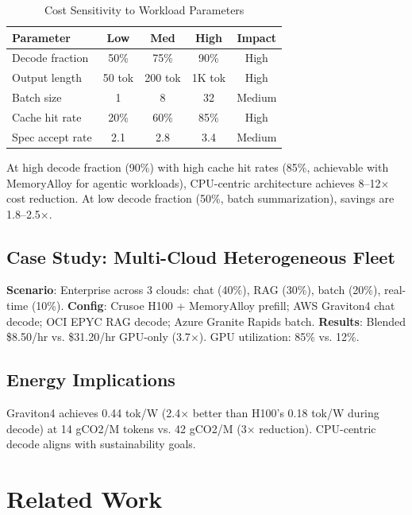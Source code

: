 \documentclass[conference,10pt]{IEEEtran}
\begin{document}
\begin{table}[!htbp]
\caption{Cost Sensitivity to Workload Parameters}
\label{tab:sensitivity}
\centering\footnotesize
\begin{tabular}{@{}lcccc@{}}
\toprule
\textbf{Parameter} & \textbf{Low} & \textbf{Med} & \textbf{High} & \textbf{Impact} \\
\midrule
Decode fraction & 50\% & 75\% & 90\% & High \\
Output length & 50 tok & 200 tok & 1K tok & High \\
Batch size & 1 & 8 & 32 & Medium \\
Cache hit rate & 20\% & 60\% & 85\% & High \\
Spec accept rate & 2.1 & 2.8 & 3.4 & Medium \\
\bottomrule
\end{tabular}
\end{table}

At high decode fraction (90\%) with high cache hit rates (85\%, achievable with MemoryAlloy for agentic workloads), CPU-centric architecture achieves 8--12$\times$ cost reduction. At low decode fraction (50\%, batch summarization), savings are 1.8--2.5$\times$.

\subsection{Case Study: Multi-Cloud Heterogeneous Fleet}

\textbf{Scenario}: Enterprise across 3 clouds: chat (40\%), RAG (30\%), batch (20\%), real-time (10\%).
\textbf{Config}: Crusoe H100 + MemoryAlloy prefill; AWS Graviton4 chat decode; OCI EPYC RAG decode; Azure Granite Rapids batch.
\textbf{Results}: Blended \$8.50/hr vs. \$31.20/hr GPU-only (3.7$\times$). GPU utilization: 85\% vs. 12\%.

\subsection{Energy Implications}

Graviton4 achieves 0.44 tok/W (2.4$\times$ better than H100's 0.18 tok/W during decode) at 14 gCO2/M tokens vs. 42 gCO2/M (3$\times$ reduction). CPU-centric decode aligns with sustainability goals.

\section{Related Work}
\label{sec:related}
\end{document}
